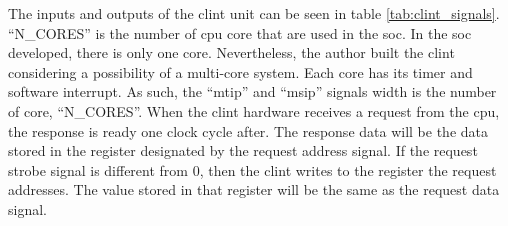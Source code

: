 The inputs and outputs of the \acrshort{clint} unit can be seen in table \ref{tab:clint_signals}. \enquote{N\_CORES} is the number of \acrshort{cpu} core that are used in the \acrshort{soc}. In the \acrfull{soc} developed, there is only one core. Nevertheless, the author built the \acrshort{clint} considering a possibility of a multi-core system. Each core has its timer and software interrupt. As such, the \enquote{mtip} and \enquote{msip} signals width is the number of core, \enquote{N\_CORES}. When the \acrshort{clint} hardware receives a request from the \acrshort{cpu}, the response is ready one clock cycle after. The response data will be the data stored in the register designated by the request address signal. If the request strobe signal is different from 0, then the \acrshort{clint} writes to the register the request addresses. The value stored in that register will be the same as the request data signal.

